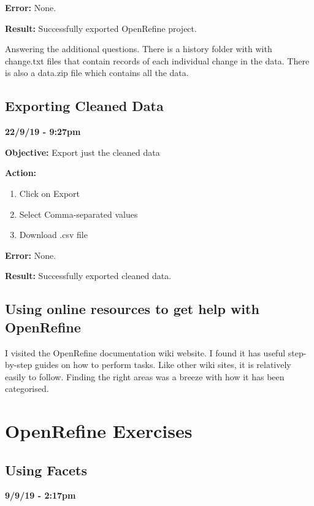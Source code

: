 \documentclass{article}
\begin{document}
\textbf{Error:} None.

\textbf{Result:} Successfully exported OpenRefine project.

Answering the additional questions. There is a history folder with with change.txt files that contain records of each individual change in the data. There is also a data.zip file which contains all the data.

\subsection{Exporting Cleaned Data}

\textbf{22/9/19 - 9:27pm}

\textbf{Objective:} Export just the cleaned data

\textbf{Action:}

\begin{enumerate}
    \item Click on Export
    \item Select Comma-separated values
    \item Download .csv file
\end{enumerate}

\textbf{Error:} None.

\textbf{Result:} Successfully exported cleaned data.

\subsection{Using online resources to get help with OpenRefine}

I visited the OpenRefine documentation wiki website. I found it has useful step-by-step guides on how to perform tasks. Like other wiki sites, it is relatively easily to follow. Finding the right areas was a breeze with how it has been categorised.

\newpage
\section{OpenRefine Exercises}

\subsection{Using Facets}

\textbf{9/9/19 - 2:17pm}
\end{document}
